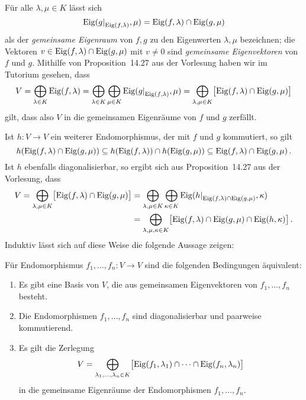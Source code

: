 \section{}

Für alle $\lambda, \mu \in K$ lässt sich
\[
    \eigenspace{ \restrict{g}{\eigenspace{f}{\lambda}} }{\mu}
  = \eigenspace{f}{\lambda} \cap \eigenspace{g}{\mu}
\]
als der \emph{gemeinsame Eigenraum} von $f, g$ zu den Eigenwerten $\lambda, \mu$ bezeichnen;
die Vektoren $v \in \operatorname{Eig}(f, \lambda) \cap \operatorname{Eig}(g, \mu)$ mit $v \neq 0$ sind \emph{gemeinsame Eigenvektoren} von $f$ und $g$.
Mithilfe von Proposition~14.27 aus der Vorlesung haben wir im Tutorium gesehen, dass
\[
    V
  = \bigoplus_{\lambda \in K} \eigenspace{f}{\lambda}
  = \bigoplus_{\lambda \in K} \bigoplus_{\mu \in K} \eigenspace{ \restrict{g}{\eigenspace{f}{\lambda}} }{\mu}
  = \bigoplus_{\lambda, \mu \in K} \bigl[ \eigenspace{f}{\lambda} \cap \eigenspace{g}{\mu} \bigr]
\]
gilt, dass also $V$ in die gemeinsamen Eigenräume von $f$ und $g$ zerfällt.

Ist $h \colon V \to V$ ein weiterer Endomorphismus, der mit $f$ und $g$ kommutiert, so gilt
\[
            h( \operatorname{Eig}(f, \lambda) \cap \operatorname{Eig}(g, \mu)  )
  \subseteq h(\operatorname{Eig}(f, \lambda)) \cap h(\operatorname{Eig}(g, \mu))
  \subseteq \operatorname{Eig}(f, \lambda) \cap \operatorname{Eig}(g, \mu) \,.
\]
Ist $h$ ebenfalls diagonalisierbar, so ergibt sich aus Proposition~14.27 aus der Vorlesung, dass
\begin{align*}
      V
   =  \bigoplus_{\lambda, \mu \in K} \bigl[ \eigenspace{f}{\lambda} \cap \eigenspace{g}{\mu} \bigr]
  &=  \bigoplus_{\lambda, \mu \in K}
      \bigoplus_{\kappa \in K}
      \eigenspace{ \restrict{h}{ \eigenspace{f}{\lambda} \cap \eigenspace{g}{\mu} } }{\kappa} \\
  &=  \bigoplus_{\lambda, \mu, \kappa \in K}
      \bigl[ \eigenspace{f}{\lambda} \cap \eigenspace{g}{\mu} \cap \eigenspace{h}{\kappa} \bigr] \,.
\end{align*}
Induktiv lässt sich auf diese Weise die folgende Aussage zeigen:

\begin{proposition}
  \label{proposition: equivalent conditions for simultaneously diagonalizable}
  Für Endomorphismus $f_1, \dotsc, f_n \colon V \to V$ sind die folgenden Bedingungen äquivalent:
  \begin{enumerate}
    \item
      Es gibt eine Basis von $V$, die aus gemeinsamen Eigenvektoren von $f_1, \dotsc, f_n$ besteht.
    \item
      Die Endomorphismen $f_1, \dotsc, f_n$ sind diagonalisierbar und paarweise kommutierend.
    \item
      Es gilt die Zerlegung
      \[
          V
        = \bigoplus_{\lambda_1, \dotsc, \lambda_n \in K}
          \bigl[ \operatorname{Eig}(f_1, \lambda_1) \cap \dotsb \cap \operatorname{Eig}(f_n, \lambda_n) \bigr]
      \]
      in die gemeinsame Eigenräume der Endomorphismen $f_1, \dotsc, f_n$.
  \end{enumerate}
\end{proposition}

